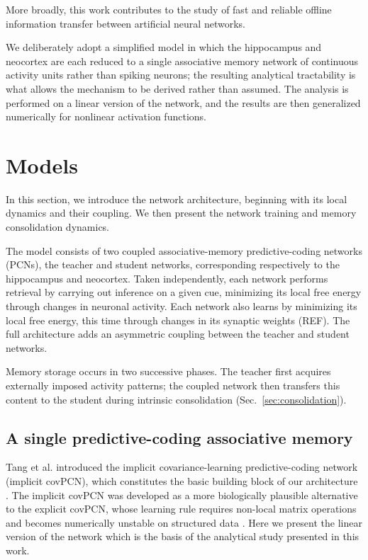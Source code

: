 \documentclass[10pt,letterpaper]{article}
\theoremstyle{plain}
\theoremstyle{remark}
\begin{document}
More broadly, this work contributes to the study of fast and reliable offline information transfer between artificial neural networks.

We deliberately adopt a simplified   model in which the hippocampus and neocortex are each reduced to a single associative memory network of continuous activity units rather than spiking neurons; the resulting analytical tractability is what allows the mechanism to be derived rather than assumed.
The analysis is performed on a linear version of the network, and the results are then generalized numerically for nonlinear activation functions.

\newpage


\section{Models}

In this section, we introduce the network architecture, beginning with its local dynamics and their coupling.
We then present the network training and memory consolidation dynamics.

The model consists of two coupled associative-memory predictive-coding networks (PCNs), the teacher and student networks, corresponding respectively to the hippocampus and neocortex. Taken independently, each network performs retrieval by carrying out inference on a given cue, minimizing its local free energy through changes in neuronal activity. Each network also learns by minimizing its local free energy, this time through changes in its synaptic weights (REF). The full architecture adds an asymmetric coupling between the teacher and student networks.

Memory storage occurs in two successive phases. The teacher first acquires externally imposed activity patterns; the coupled network then transfers this content to the student during intrinsic consolidation (Sec.~\ref{sec:consolidation}).



\subsection{A single predictive-coding associative memory}

Tang et al. introduced the implicit covariance-learning predictive-coding network (implicit covPCN), which constitutes the basic building block of our architecture \cite{tang2023covpcn}. The implicit covPCN was developed as a more biologically plausible alternative to the explicit covPCN, whose learning rule requires non-local matrix operations and becomes numerically unstable on structured data \cite{friston2003learning,friston2005theory,bogacz2017tutorial,tang2023covpcn}. Here we present the linear version of the network which is the basis of the analytical study presented in this work.
\end{document}
